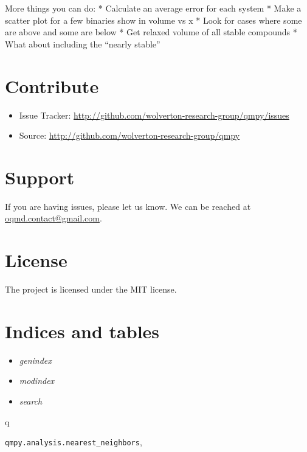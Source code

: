 \documentclass[letterpaper,10pt,english]{sphinxmanual}
\begin{document}
More things you can do:
* Calculate an average error for each system
* Make a scatter plot for a few binaries show in volume vs x
* Look for cases where some are above and some are below
* Get relaxed volume of all stable compounds
* What about including the ``nearly stable''


\chapter{Contribute}
\label{index:contribute}\begin{itemize}
\item {} 
Issue Tracker: \href{http://github.com/wolverton-research-group/qmpy/issues}{http://github.com/wolverton-research-group/qmpy/issues}

\item {} 
Source: \href{http://github.com/wolverton-research-group/qmpy}{http://github.com/wolverton-research-group/qmpy}

\end{itemize}


\chapter{Support}
\label{index:support}
If you are having issues, please let us know.
We can be reached at \href{mailto:oqmd.contact@gmail.com}{oqmd.contact@gmail.com}.


\chapter{License}
\label{index:license}
The project is licensed under the MIT license.


\chapter{Indices and tables}
\label{index:indices-and-tables}\begin{itemize}
\item {} 
\emph{genindex}

\item {} 
\emph{modindex}

\item {} 
\emph{search}

\end{itemize}


\renewcommand{\indexname}{Python Module Index}
\begin{theindex}
\def\bigletter#1{{\Large\sffamily#1}\nopagebreak\vspace{1mm}}
\bigletter{q}
\item {\texttt{qmpy.analysis.nearest\_neighbors}}, \pageref{models:module-qmpy.analysis.nearest_neighbors}
\end{theindex}

\renewcommand{\indexname}{Index}
\printindex
\end{document}
